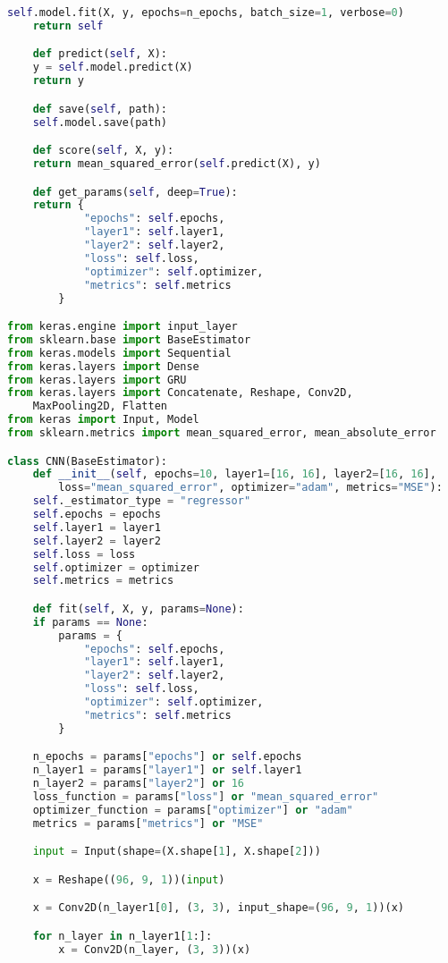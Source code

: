 \begin{lstlisting}[label=python-listing,caption={Kod źródłowy},language=python]
    self.model.fit(X, y, epochs=n_epochs, batch_size=1, verbose=0)
    return self

    def predict(self, X):
    y = self.model.predict(X)
    return y

    def save(self, path):
    self.model.save(path)

    def score(self, X, y):
    return mean_squared_error(self.predict(X), y)

    def get_params(self, deep=True):
    return {
            "epochs": self.epochs,
            "layer1": self.layer1,
            "layer2": self.layer2,
            "loss": self.loss,
            "optimizer": self.optimizer,
            "metrics": self.metrics
        }

from keras.engine import input_layer
from sklearn.base import BaseEstimator
from keras.models import Sequential 
from keras.layers import Dense 
from keras.layers import GRU
from keras.layers import Concatenate, Reshape, Conv2D, 
    MaxPooling2D, Flatten
from keras import Input, Model
from sklearn.metrics import mean_squared_error, mean_absolute_error

class CNN(BaseEstimator):
    def __init__(self, epochs=10, layer1=[16, 16], layer2=[16, 16], 
        loss="mean_squared_error", optimizer="adam", metrics="MSE"):
    self._estimator_type = "regressor"
    self.epochs = epochs
    self.layer1 = layer1
    self.layer2 = layer2
    self.loss = loss
    self.optimizer = optimizer
    self.metrics = metrics

    def fit(self, X, y, params=None):
    if params == None:
        params = {
            "epochs": self.epochs,
            "layer1": self.layer1,
            "layer2": self.layer2,
            "loss": self.loss,
            "optimizer": self.optimizer,
            "metrics": self.metrics
        }

    n_epochs = params["epochs"] or self.epochs
    n_layer1 = params["layer1"] or self.layer1
    n_layer2 = params["layer2"] or 16
    loss_function = params["loss"] or "mean_squared_error"
    optimizer_function = params["optimizer"] or "adam"
    metrics = params["metrics"] or "MSE"

    input = Input(shape=(X.shape[1], X.shape[2]))

    x = Reshape((96, 9, 1))(input)

    x = Conv2D(n_layer1[0], (3, 3), input_shape=(96, 9, 1))(x)

    for n_layer in n_layer1[1:]:
        x = Conv2D(n_layer, (3, 3))(x)


\end{lstlisting}

